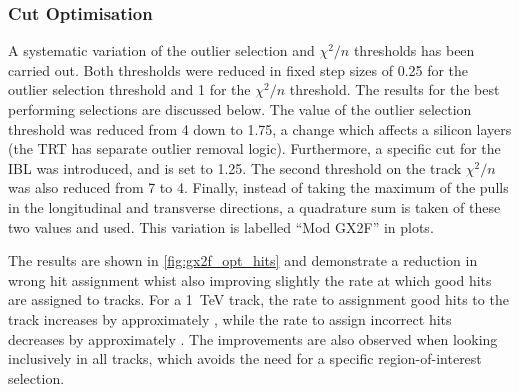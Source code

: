 \subsubsection{Cut Optimisation}

A systematic variation of the outlier selection and $\chi^2/n$ thresholds has been carried out.
Both thresholds were reduced in fixed step sizes of 0.25 for the outlier selection threshold and 1 for the $\chi^2/n$ threshold.
The results for the best performing selections are discussed below.
The value of the outlier selection threshold was reduced from 4 down to 1.75, a change which affects a silicon layers (the TRT has separate outlier removal logic).
Furthermore, a specific cut for the IBL was introduced, and is set to 1.25.
The second threshold on the track $\chi^2/n$ was also reduced from 7 to 4.
Finally, instead of taking the maximum of the pulls in the longitudinal and transverse directions, a quadrature sum is taken of these two values and used.
This variation is labelled ``Mod GX2F'' in plots.

The results are shown in \cref{fig:gx2f_opt_hits} and demonstrate a reduction in wrong hit assignment whist also improving slightly the rate at which good hits are assigned to tracks.
For a \SI{1}{\TeV} track, the rate to assignment good hits to the track increases by approximately , while the rate to assign incorrect hits decreases by approximately .
The improvements are also observed when looking inclusively in all tracks, which avoids the need for a specific \bjet region-of-interest selection.

